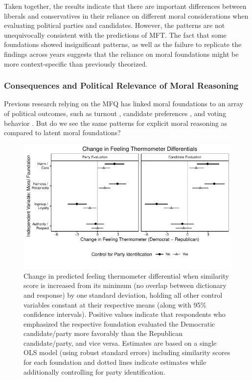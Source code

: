 \documentclass[12pt]{article}
\begin{document}
Taken together, the results indicate that there are important differences between liberals and conservatives in their reliance on different moral considerations when evaluating political parties and candidates. However, the patterns are not unequivocally consistent with the predictions of MFT. The fact that some foundations showed insignificant patterns, as well as the failure to replicate the findings across years suggests that the reliance on moral foundations might be more context-specific than previously theorized.


\subsubsection{Consequences and Political Relevance of Moral Reasoning}

Previous research relying on the MFQ has linked moral foundations to an array of political outcomes, such as turnout \citep{johnson2014ideology}, candidate preferences \citep{iyer2010beyond}, and voting behavior \citep{franks2015using}. But do we see the same patterns for explicit moral reasoning as compared to latent moral foundations?

\begin{figure}[h]\centering
\includegraphics{../calc/fig/ols_feel.pdf}
\caption{Change in predicted feeling thermometer differential when similarity score is increased from its minimum (no overlap between dictionary and response) by one standard deviation, holding all other control variables constant at their respective means (along with 95\% confidence intervals). Positive values indicate that respondents who emphasized the respective foundation evaluated the Democratic candidate/party more favorably than the Republican candidate/party, and vice versa. Estimates are based on a single OLS model (using robust standard errors) including similarity scores for each foundation and dotted lines indicate estimates while additionally controlling for party identification. %
}\label{fig:ols_feel}
\end{figure}
\end{document}
